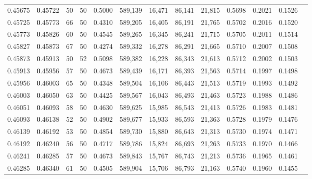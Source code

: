\begin{tabular}{rrrrrrrrrrrrr}
0.45675 & 0.45722 &    50 &  50 &                                     0.5000 & 589,139 &  16,471 &  86,141 &  21,815 & 0.5698 & 0.2021 & 0.1526 \\
0.45725 & 0.45773 &    66 &  50 &                                     0.4310 & 589,205 &  16,405 &  86,191 &  21,765 & 0.5702 & 0.2016 & 0.1520 \\
0.45773 & 0.45826 &    60 &  50 &                                     0.4545 & 589,265 &  16,345 &  86,241 &  21,715 & 0.5705 & 0.2011 & 0.1514 \\
0.45827 & 0.45873 &    67 &  50 &                                     0.4274 & 589,332 &  16,278 &  86,291 &  21,665 & 0.5710 & 0.2007 & 0.1508 \\
0.45873 & 0.45913 &    50 &  52 &                                     0.5098 & 589,382 &  16,228 &  86,343 &  21,613 & 0.5712 & 0.2002 & 0.1503 \\
0.45913 & 0.45956 &    57 &  50 &                                     0.4673 & 589,439 &  16,171 &  86,393 &  21,563 & 0.5714 & 0.1997 & 0.1498 \\
0.45956 & 0.46003 &    65 &  50 &                                     0.4348 & 589,504 &  16,106 &  86,443 &  21,513 & 0.5719 & 0.1993 & 0.1492 \\
0.46003 & 0.46050 &    63 &  50 &                                     0.4425 & 589,567 &  16,043 &  86,493 &  21,463 & 0.5723 & 0.1988 & 0.1486 \\
0.46051 & 0.46093 &    58 &  50 &                                     0.4630 & 589,625 &  15,985 &  86,543 &  21,413 & 0.5726 & 0.1983 & 0.1481 \\
0.46093 & 0.46138 &    52 &  50 &                                     0.4902 & 589,677 &  15,933 &  86,593 &  21,363 & 0.5728 & 0.1979 & 0.1476 \\
0.46139 & 0.46192 &    53 &  50 &                                     0.4854 & 589,730 &  15,880 &  86,643 &  21,313 & 0.5730 & 0.1974 & 0.1471 \\
0.46192 & 0.46240 &    56 &  50 &                                     0.4717 & 589,786 &  15,824 &  86,693 &  21,263 & 0.5733 & 0.1970 & 0.1466 \\
0.46241 & 0.46285 &    57 &  50 &                                     0.4673 & 589,843 &  15,767 &  86,743 &  21,213 & 0.5736 & 0.1965 & 0.1461 \\
0.46285 & 0.46340 &    61 &  50 &                                     0.4505 & 589,904 &  15,706 &  86,793 &  21,163 & 0.5740 & 0.1960 & 0.1455 \\

\end{tabular}
